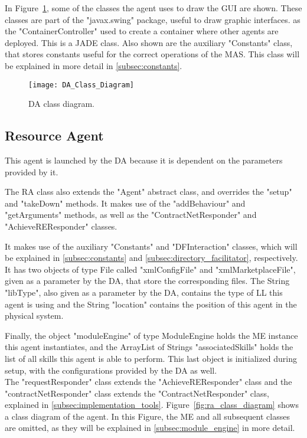 In Figure~\ref{fig:da_class_diagram}, some of the classes the agent uses to draw the \acrshort{GUI} are shown. These classes are part of the "javax.swing" package, useful to draw graphic interfaces. as the "ContainerController" used to create a container where other agents are deployed. This is a \acrshort{JADE} class. Also shown are the auxiliary "Constants" class, that stores constants useful for the correct operations of the \acrshort{MAS}. This class will be explained in more detail in \ref{subsec:constants}.\\

\begin{figure}[h!]
	\centering
	\texttt{[image: DA\_Class\_Diagram]}
	\caption{\acrlong{DA} class diagram.}
	\label{fig:da_class_diagram}
\end{figure}

\subsection{Resource Agent}
\label{subsec:resource_agent}

This agent is launched by the \acrshort{DA} because it is dependent on the parameters provided by it.

The \acrlong{RA} class also extends the "Agent" abstract class, and overrides the "setup" and "takeDown" methods. It makes use of the "addBehaviour" and "getArguments" methods, as well as the "ContractNetResponder" and "AchieveREResponder" classes.

It makes use of the auxiliary "Constants" and "DFInteraction" classes, which will be explained in \ref{subsec:constants} and \ref{subsec:directory_facilitator}, respectively. It has two objects of type File called "xmlConfigFile" and "xmlMarketplaceFile", given as a parameter by the \acrshort{DA}, that store the corresponding files. The String "libType", also given as a parameter by the \acrshort{DA}, contains the type of \acrshort{LL} this agent is using and the String "location" contains the position of this agent in the physical system.

Finally, the object "moduleEngine" of type ModuleEngine holds the \acrshort{ME} instance this agent instantiates, and the ArrayList of Strings "associatedSkills" holds the list of all skills this agent is able to perform. This last object is initialized during setup, with the configurations provided by the \acrshort{DA} as well.\\

The "requestResponder" class extends the "AchieveREResponder" class and the "contractNetResponder" class extends the "ContractNetResponder" class, explained in \ref{subsec:implementation_tools}. Figure~\ref{fig:ra_class_diagram} shows a class diagram of the agent. In this Figure, the \acrlong{ME} and all subsequent classes are omitted, as they will be explained in \ref{subsec:module_engine} in more detail.\\

